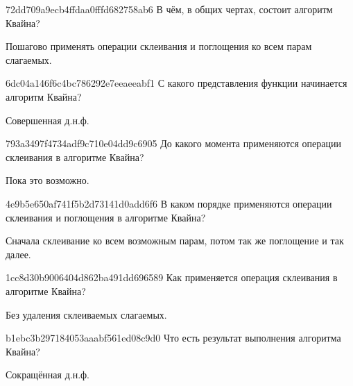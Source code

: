 \begin{note}{72dd709a9ecb4ffdaa0fffd682758ab6}
    В чём, в общих чертах, состоит алгоритм Квайна?

    \begin{cloze}{1}
        Пошагово применять операции склеивания и поглощения ко всем парам слагаемых.
    \end{cloze}
\end{note}

\begin{note}{6dc04a146f6c4bc786292e7eeaeeabf1}
    С какого представления функции начинается алгоритм Квайна?

    \begin{cloze}{1}
        Совершенная д.н.ф.
    \end{cloze}
\end{note}

\begin{note}{793a3497f4734adf9c710e04dd9c6905}
    До какого момента применяются операции склеивания в алгоритме Квайна?

    \begin{cloze}{1}
        Пока это возможно.
    \end{cloze}
\end{note}

\begin{note}{4e9b5e650af741f5b2d73141d0add6f6}
    В каком порядке применяются операции склеивания и поглощения в алгоритме Квайна?

    \begin{cloze}{1}
        Сначала склеивание ко всем возможным парам, потом так же поглощение и так далее.
    \end{cloze}
\end{note}

\begin{note}{1cc8d30b9006404d862ba491dd696589}
    Как применяется операция склеивания в алгоритме Квайна?

    \begin{cloze}{1}
        Без удаления склеиваемых слагаемых.
    \end{cloze}
\end{note}

\begin{note}{b1ebc3b297184053aaabf561ed08c9d0}
    Что есть результат выполнения алгоритма Квайна?

    \begin{cloze}{1}
        Сокращённая д.н.ф.
    \end{cloze}
\end{note}

